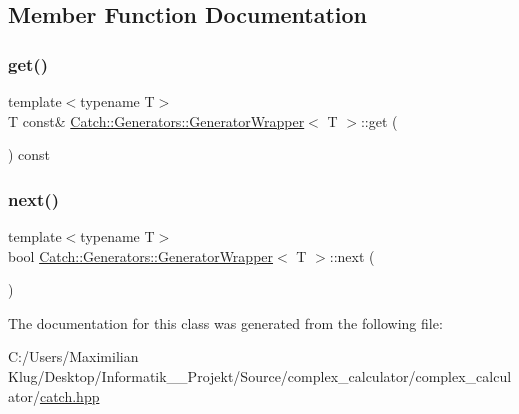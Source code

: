 \subsection{Member Function Documentation}
\mbox{\label{class_catch_1_1_generators_1_1_generator_wrapper_a271f0f905f2c473c907550435b81e102}} 
\subsubsection{\texorpdfstring{get()}{get()}}
{\footnotesize\ttfamily template$<$typename T$>$ \\
T const\& \mbox{\hyperlink{class_catch_1_1_generators_1_1_generator_wrapper}{Catch\+::\+Generators\+::\+Generator\+Wrapper}}$<$ T $>$\+::get (\begin{DoxyParamCaption}{ }\end{DoxyParamCaption}) const\hspace{0.3cm}{\ttfamily [inline]}}

\mbox{\label{class_catch_1_1_generators_1_1_generator_wrapper_acbfdca94811ae02461bd2cf5f60b666e}} 
\subsubsection{\texorpdfstring{next()}{next()}}
{\footnotesize\ttfamily template$<$typename T$>$ \\
bool \mbox{\hyperlink{class_catch_1_1_generators_1_1_generator_wrapper}{Catch\+::\+Generators\+::\+Generator\+Wrapper}}$<$ T $>$\+::next (\begin{DoxyParamCaption}{ }\end{DoxyParamCaption})\hspace{0.3cm}{\ttfamily [inline]}}



The documentation for this class was generated from the following file\+:\begin{DoxyCompactItemize}
\item 
C\+:/\+Users/\+Maximilian Klug/\+Desktop/\+Informatik\+\_\+\_\+\+Projekt/\+Source/complex\+\_\+calculator/complex\+\_\+calculator/\mbox{\hyperlink{catch_8hpp}{catch.\+hpp}}\end{DoxyCompactItemize}
